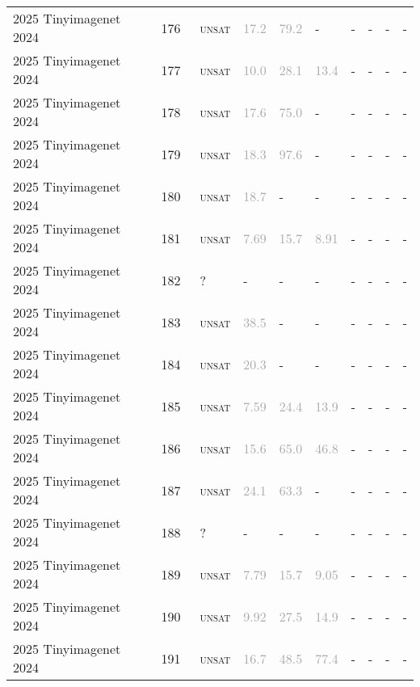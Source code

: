 \begin{center}
{\begin{longtable}{@{}llllllllll@{}}
2025 Tinyimagenet 2024 & 176 & ~\textsc{unsat} & \textcolor{darkgray}{17.2} & \textcolor{darkgray}{79.2} & - & - & - & - & - \\
2025 Tinyimagenet 2024 & 177 & ~\textsc{unsat} & \textcolor{darkgray}{10.0} & \textcolor{darkgray}{28.1} & \textcolor{darkgray}{13.4} & - & - & - & - \\
2025 Tinyimagenet 2024 & 178 & ~\textsc{unsat} & \textcolor{darkgray}{17.6} & \textcolor{darkgray}{75.0} & - & - & - & - & - \\
2025 Tinyimagenet 2024 & 179 & ~\textsc{unsat} & \textcolor{darkgray}{18.3} & \textcolor{darkgray}{97.6} & - & - & - & - & - \\
2025 Tinyimagenet 2024 & 180 & ~\textsc{unsat} & \textcolor{darkgray}{18.7} & - & - & - & - & - & - \\
2025 Tinyimagenet 2024 & 181 & ~\textsc{unsat} & \textcolor{darkgray}{7.69} & \textcolor{darkgray}{15.7} & \textcolor{darkgray}{8.91} & - & - & - & - \\
2025 Tinyimagenet 2024 & 182 & ~? & - & - & - & - & - & - & - \\
2025 Tinyimagenet 2024 & 183 & ~\textsc{unsat} & \textcolor{darkgray}{38.5} & - & - & - & - & - & - \\
2025 Tinyimagenet 2024 & 184 & ~\textsc{unsat} & \textcolor{darkgray}{20.3} & - & - & - & - & - & - \\
2025 Tinyimagenet 2024 & 185 & ~\textsc{unsat} & \textcolor{darkgray}{7.59} & \textcolor{darkgray}{24.4} & \textcolor{darkgray}{13.9} & - & - & - & - \\
2025 Tinyimagenet 2024 & 186 & ~\textsc{unsat} & \textcolor{darkgray}{15.6} & \textcolor{darkgray}{65.0} & \textcolor{darkgray}{46.8} & - & - & - & - \\
2025 Tinyimagenet 2024 & 187 & ~\textsc{unsat} & \textcolor{darkgray}{24.1} & \textcolor{darkgray}{63.3} & - & - & - & - & - \\
2025 Tinyimagenet 2024 & 188 & ~? & - & - & - & - & - & - & - \\
2025 Tinyimagenet 2024 & 189 & ~\textsc{unsat} & \textcolor{darkgray}{7.79} & \textcolor{darkgray}{15.7} & \textcolor{darkgray}{9.05} & - & - & - & - \\
2025 Tinyimagenet 2024 & 190 & ~\textsc{unsat} & \textcolor{darkgray}{9.92} & \textcolor{darkgray}{27.5} & \textcolor{darkgray}{14.9} & - & - & - & - \\
2025 Tinyimagenet 2024 & 191 & ~\textsc{unsat} & \textcolor{darkgray}{16.7} & \textcolor{darkgray}{48.5} & \textcolor{darkgray}{77.4} & - & - & - & - \\

\end{longtable}}
\end{center}
